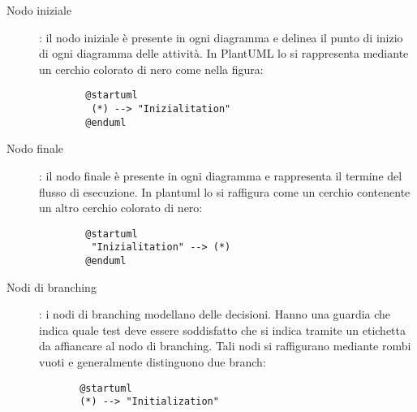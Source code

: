 \documentclass[../../norme-di-progetto.tex]{subfiles}
\begin{document}
  \begin{description}
    \item[Nodo iniziale]: il nodo iniziale è presente in ogni diagramma e delinea il punto di inizio di ogni diagramma delle attività. In PlantUML lo si rappresenta mediante un cerchio colorato di nero come nella figura:
    \begin{center}
      \begin{verbatim}
        @startuml
         (*) --> "Inizialitation"
        @enduml
      \end{verbatim}
    \end{center}
    \item[Nodo finale]: il nodo finale è presente in ogni diagramma e rappresenta il termine del flusso di esecuzione. In plantuml lo si raffigura come un cerchio contenente un altro cerchio colorato di nero:
    \begin{center}
      \begin{verbatim}
        @startuml
         "Inizialitation" --> (*)
        @enduml
      \end{verbatim}
    \end{center}
    \item[Nodi di branching]: i nodi di branching modellano delle decisioni. Hanno una guardia che indica quale test deve essere soddisfatto che si indica tramite un etichetta da affiancare al nodo di branching. Tali nodi si raffigurano mediante rombi vuoti e generalmente distinguono due branch:
    \begin{center}
      \begin{verbatim}
       @startuml
       (*) --> "Initialization"


\end{verbatim}
\end{center}
\end{description}
\end{document}
